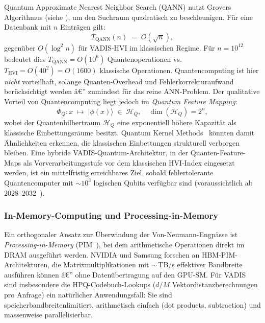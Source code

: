 ﻿\documentclass[12pt,a4paper]{article}
\begin{document}
Quantum Approximate Nearest Neighbor Search (QANN)
nutzt Grovers Algorithmus (siehe \cite{grover1996fast}),
um den Suchraum quadratisch zu beschleunigen.
Für eine Datenbank mit $n$ Einträgen gilt:
\begin{equation}
  T_{\text{QANN}}(n) \;=\; O\!\left(\sqrt{n}\right),
\end{equation}
gegenüber $O(\log^2 n)$ für VADIS-HVI im klassischen Regime.
Für $n = 10^{12}$ bedeutet dies $T_{\text{QANN}} = O(10^6)$
Quantenoperationen vs. $T_{\text{HVI}} = O(40^2) = O(1600)$
klassische Operationen. Quantencomputing ist hier
\emph{nicht} vorteilhaft, solange Quanten-Overhead und
Fehlerkorrekturaufwand berücksichtigt werden â€” zumindest
für das reine ANN-Problem. Der qualitative Vorteil
von Quantencomputing liegt jedoch im
\emph{Quantum Feature Mapping}:
\begin{equation}
  \Phi_Q: x \;\mapsto\; |\phi(x)\rangle \;\in\;
  \mathcal{H}_Q,\quad \dim(\mathcal{H}_Q) = 2^n,
\end{equation}
wobei der Quantenhilbertraum $\mathcal{H}_Q$ eine
exponentiell höhere Kapazität als klassische
Einbettungsräume besitzt. Quantum Kernel
Methods~\cite{havlicek2019supervised} könnten damit
Ähnlichkeiten erkennen, die klassischen Einbettungen
strukturell verborgen bleiben. Eine hybride
VADIS-Quantum-Architektur, in der Quanten-Feature-Maps
als Vorverarbeitungs\-stufe vor dem klassischen HVI-Index
eingesetzt werden, ist ein mittelfristig erreichbares Ziel,
sobald fehlertolerante Quantencomputer mit $\sim 10^3$
logischen Qubits verfügbar sind
(voraussichtlich ab 2028--2032~\cite{preskill2018quantumcomputing}).

\subsubsection{In-Memory-Computing und Processing-in-Memory}

Ein orthogonaler Ansatz zur Überwindung der
Von-Neumann-Engpässe ist \emph{Processing-in-Memory}
(PIM~\cite{ghose2019processing}), bei dem arithmetische
Operationen direkt im DRAM ausgeführt werden.
NVIDIA und Samsung forschen an HBM-PIM-Architekturen,
die Matrixmultiplikationen mit $\sim$\,TB/s effektiver
Bandbreite ausführen können â€” ohne Datenübertragung
auf den GPU-SM. Für VADIS sind insbesondere die
HPQ-Codebuch-Lookups ($d/M$ Vektordistanzberechnungen
pro Anfrage) ein natürlicher Anwendungsfall: Sie sind
speicherbandbreitenlimitiert, arithmetisch einfach
(dot products, subtraction) und massenweise parallelisierbar.
\end{document}
